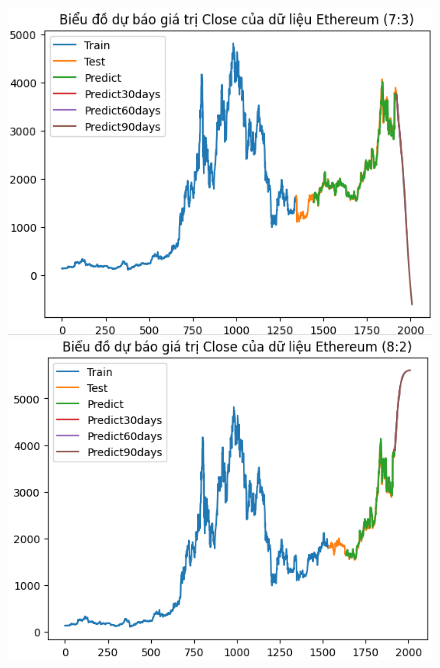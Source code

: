 \documentclass[conference]{IEEEtran}
\begin{document}
	\begin{figure}[H]
		\centering
		\begin{minipage}{0.15\textwidth}
			\centering
			\includegraphics[width=1\textwidth]{Figure/RNN_ETH73.png}
		\end{minipage}
		\hfill
		\begin{minipage}{0.15\textwidth}
			\centering
			\includegraphics[width=1\textwidth]{Figure/RNN_ETH82.png}
		\end{minipage}
		\hfill
		\begin{minipage}{0.15\textwidth}
			\centering

\end{minipage}
\end{figure}
\end{document}
